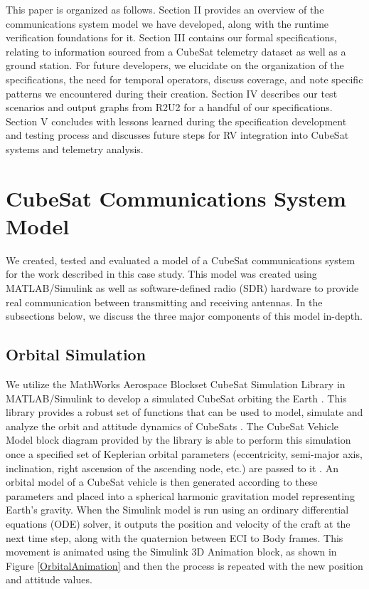 \documentclass[conf]{new-aiaa}
\begin{document}
This paper is organized as follows. Section II provides an overview of the communications system model we have developed, along with the runtime verification foundations for it. Section III contains our formal specifications, relating to information sourced from a CubeSat telemetry dataset as well as a ground station. For future developers, we elucidate on the organization of the specifications, the need for temporal operators, discuss coverage, and note specific patterns we encountered during their creation. Section IV describes our test scenarios and output graphs from R2U2 for a handful of our specifications. Section V concludes with lessons learned during the specification development and testing process and discusses future steps for RV integration into CubeSat systems and telemetry analysis.

\section{CubeSat Communications System Model}

We created, tested and evaluated a model of a CubeSat communications system for the work described in this case study. This model was created using MATLAB/Simulink as well as software-defined radio (SDR) hardware to provide real communication between transmitting and receiving antennas. In the subsections below, we discuss the three major components of this model in-depth.

\subsection{Orbital Simulation}

We utilize the MathWorks Aerospace Blockset CubeSat Simulation Library in MATLAB/Simulink to develop a simulated CubeSat orbiting the Earth \cite{MATLAB:2019}. This library provides a robust set of functions that can be used to model, simulate and analyze the orbit and attitude dynamics of CubeSats \cite{AerospaceBlockset}. The CubeSat Vehicle Model block diagram provided by the library is able to perform this simulation once a specified set of Keplerian orbital parameters (eccentricity, semi-major axis, inclination, right ascension of the ascending node, etc.) are passed to it \cite{AerospaceModeling}. An orbital model of a CubeSat vehicle is then generated according to these parameters and placed into a spherical harmonic gravitation model representing Earth's gravity. When the Simulink model is run using an ordinary differential equations (ODE) solver, it outputs the position and velocity of the craft at the next time step, along with the quaternion between ECI to Body frames. This movement is animated using the Simulink 3D Animation block, as shown in Figure \ref{OrbitalAnimation} and then the process is repeated with the new position and attitude values.
\end{document}
